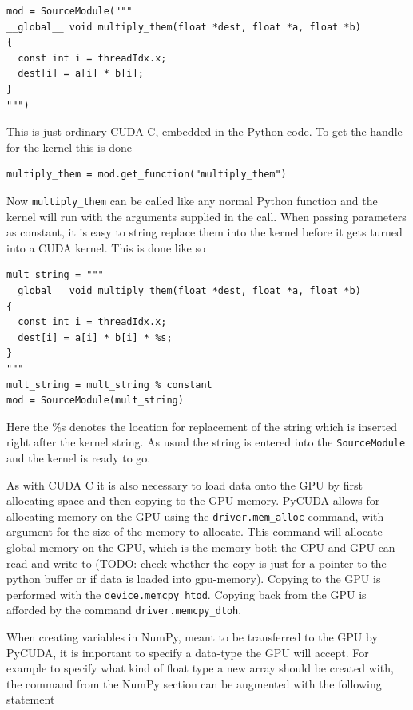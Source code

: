 \begin{verbatim}
mod = SourceModule("""
__global__ void multiply_them(float *dest, float *a, float *b)
{
  const int i = threadIdx.x;
  dest[i] = a[i] * b[i];
}
""")
\end{verbatim}

This is just ordinary CUDA C, embedded in the Python code. To get the handle for the kernel this is done

\begin{verbatim}
multiply_them = mod.get_function("multiply_them")
\end{verbatim}

Now \texttt{multiply\_them} can be called like any normal Python function and the kernel will run with the arguments supplied in the call. When passing parameters as constant, it is easy to string replace them into the kernel before it gets turned into a CUDA kernel. This is done like so

\begin{verbatim}
mult_string = """
__global__ void multiply_them(float *dest, float *a, float *b)
{
  const int i = threadIdx.x;
  dest[i] = a[i] * b[i] * %s;
}
"""
mult_string = mult_string % constant
mod = SourceModule(mult_string)
\end{verbatim}

Here the \%s denotes the location for replacement of the string which is inserted right after the kernel string. As usual the string is entered into the \texttt{SourceModule} and the kernel is ready to go.

As with CUDA C it is also necessary to load data onto the GPU by first allocating space and then copying to the GPU-memory. PyCUDA allows for allocating memory on the GPU using the \texttt{driver.mem\_alloc} command, with argument for the size of the memory to allocate. This command will allocate global memory on the GPU, which is the memory both the CPU and GPU can read and write to (TODO: check whether the copy is just for a pointer to the python buffer or if data is loaded into gpu-memory). Copying to the GPU is performed with the \texttt{device.memcpy\_htod}. Copying back from the GPU is afforded by the command \texttt{driver.memcpy\_dtoh}.

When creating variables in NumPy, meant to be transferred to the GPU by PyCUDA, it is important to specify a data-type the GPU will accept. For example to specify what kind of float type a new array should be created with, the command from the NumPy section can be augmented with the following statement

